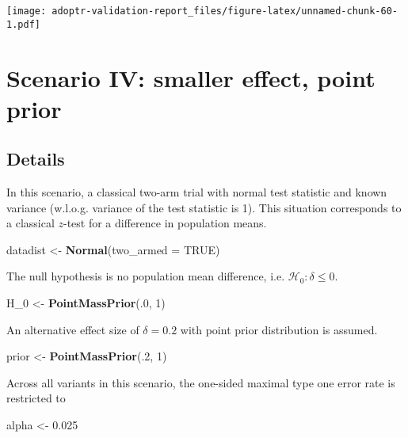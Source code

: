 \documentclass[]{book}
\newenvironment{Shaded}{\begin{snugshade}}{\end{snugshade}}
\newcommand{\DataTypeTok}[1]{\textcolor[rgb]{0.13,0.29,0.53}{#1}}
\newcommand{\DecValTok}[1]{\textcolor[rgb]{0.00,0.00,0.81}{#1}}
\newcommand{\FloatTok}[1]{\textcolor[rgb]{0.00,0.00,0.81}{#1}}
\newcommand{\KeywordTok}[1]{\textcolor[rgb]{0.13,0.29,0.53}{\textbf{#1}}}
\newcommand{\NormalTok}[1]{#1}
\newcommand{\OtherTok}[1]{\textcolor[rgb]{0.56,0.35,0.01}{#1}}
\newcommand{\StringTok}[1]{\textcolor[rgb]{0.31,0.60,0.02}{#1}}
\begin{document}
\texttt{[image: adoptr-validation-report\_files/figure-latex/unnamed-chunk-60-1.pdf]}

\hypertarget{scenarioIV}{%
\chapter{Scenario IV: smaller effect, point prior}\label{scenarioIV}}

\hypertarget{details-3}{%
\section{Details}\label{details-3}}

In this scenario, a classical two-arm trial with normal
test statistic and known variance (w.l.o.g. variance of
the test statistic is 1).
This situation corresponds to a classical \(z\)-test for
a difference in population means.

\begin{Shaded}
\begin{Highlighting}[]
\NormalTok{datadist <-}\StringTok{ }\KeywordTok{Normal}\NormalTok{(}\DataTypeTok{two_armed =} \OtherTok{TRUE}\NormalTok{)}
\end{Highlighting}
\end{Shaded}

The null hypothesis is no population mean difference, i.e.
\(\mathcal{H}_0:\delta \leq 0\).

\begin{Shaded}
\begin{Highlighting}[]
\NormalTok{H_}\DecValTok{0}\NormalTok{ <-}\StringTok{ }\KeywordTok{PointMassPrior}\NormalTok{(.}\DecValTok{0}\NormalTok{, }\DecValTok{1}\NormalTok{)}
\end{Highlighting}
\end{Shaded}

An alternative effect size of \(\delta = 0.2\) with
point prior distribution is assumed.

\begin{Shaded}
\begin{Highlighting}[]
\NormalTok{prior <-}\StringTok{ }\KeywordTok{PointMassPrior}\NormalTok{(.}\DecValTok{2}\NormalTok{, }\DecValTok{1}\NormalTok{)}
\end{Highlighting}
\end{Shaded}

Across all variants in this scenario, the one-sided maximal
type one error rate is restricted to

\begin{Shaded}
\begin{Highlighting}[]
\NormalTok{alpha <-}\StringTok{ }\FloatTok{0.025}
\end{Highlighting}
\end{Shaded}
\end{document}
